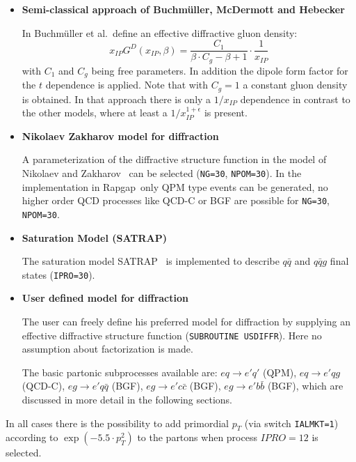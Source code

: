\documentclass[10pt]{article} \usepackage{dina4}
\newcommand{\pom}{I\!\!P}
\newcommand{\xpom}{x_{\pom}}
\def\RAPGAP{{\sc Rapgap}}
\begin{document}
\begin{itemize}
\item {\bf Semi-classical approach of Buchm\"uller, McDermott and Hebecker} 

In \cite{Buchmuller_Hebecker_Mcdermott} Buchm\"uller et al.\ define an
effective diffractive gluon density:
\begin{equation}
\xpom G^D(\xpom,\beta) = \frac{C_1}{\beta \cdot C_g - \beta + 1} 
               \cdot  \frac{1}{\xpom}
\end{equation}
with $C_1$ and $C_g$ being free parameters. In addition the dipole form 
factor for the $t$ dependence is applied. Note that with $C_g=1$ a
constant gluon density is obtained. In that approach there is only 
a $1/\xpom$ dependence in contrast to the other models, where at least 
a $1/\xpom^{1+\epsilon}$ is present.


\item {\bf Nikolaev Zakharov model for diffraction} 

A parameterization of the diffractive structure function in the model of
Nikolaev and Zakharov~\cite{NikZak} can be selected 
(\verb+NG=30+, \verb+NPOM=30+). In the implementation in \RAPGAP\
only QPM type events can be 
generated, no higher order QCD processes like QCD-C or BGF
are possible for \verb+NG=30+, \verb+NPOM=30+.

\item {\bf Saturation Model (SATRAP)} 

The saturation model SATRAP~\cite{satrap} is implemented to describe $q\bar{q}$  and 
$q\bar{q} g$  final states (\verb+IPRO=30+).

\item {\bf User defined model for diffraction} 

 The user can freely define his preferred model for diffraction by supplying
 an effective diffractive structure function 
(\verb+SUBROUTINE USDIFFR+). 
 Here no assumption about factorization is made.
\par
The basic partonic
 subprocesses available are: $eq \rightarrow e' q'$ (QPM),
                            $eq \rightarrow e' q g$ (QCD-C),
 $eg \rightarrow e' q \bar{q}$ (BGF),
  $eg \rightarrow e' c \bar{c}$ (BGF),
 $eg \rightarrow e' b \bar{b}$ (BGF), which are discussed in more detail
in the following sections.
\end{itemize}
In all cases there is the possibility to add primordial $p_T$ 
(via switch \verb+IALMKT=1+) 
according to $\exp{(-5.5 \cdot p_T^2)}$ to the
partons when process $IPRO=12$ is selected.
\end{document}
